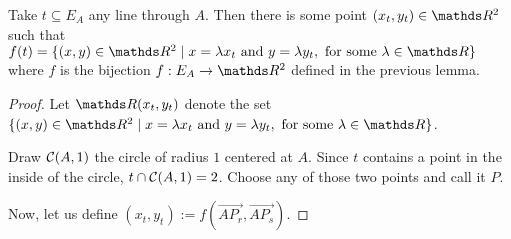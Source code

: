 \begin{lemma}
	Take $t\subseteq E_A$ any line through $A$. Then there is some point $(x_t,y_t)\in \R^2$ such that $f(t)=\{(x,y)\in\R^2\mid x=\lambda x_t \mbox{ and }y=\lambda y_t,\mbox{ for some }\lambda\in\R\}$ where $f$ is the bijection $f:E_A\to \R^2$ defined in the previous lemma.
\end{lemma}
\begin{proof}
	Let $\R(x_t,y_t)$ denote the set $\{(x,y)\in\R^2\mid x=\lambda x_t \mbox{ and }y=\lambda y_t,\mbox{ for some }\lambda\in\R\}$.
	
	Draw $\mathcal C(A,1)$ the circle of radius $1$ centered at $A$. Since $t$ contains a point in the inside of the circle, $t\cap \mathcal C(A,1)=2$. Choose any of those two points and call it $P$.
	
	Now, let us define $(x_t,y_t):=f(\overrightarrow{AP_r},\overrightarrow{AP_s})$.
	

\end{proof}
